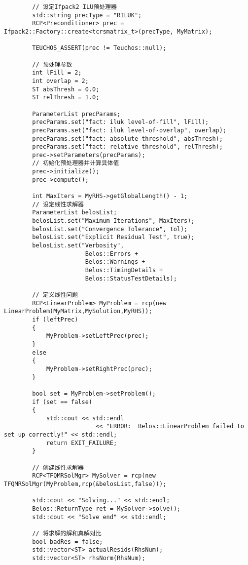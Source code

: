 \begin{lstlisting}
        // 设定Ifpack2 ILU预处理器
        std::string precType = "RILUK";
        RCP<Preconditioner> prec = Ifpack2::Factory::create<tcrsmatrix_t>(precType, MyMatrix);
        
        TEUCHOS_ASSERT(prec != Teuchos::null);

        // 预处理参数
        int lFill = 2;
        int overlap = 2;
        ST absThresh = 0.0;
        ST relThresh = 1.0;

        ParameterList precParams;
        precParams.set("fact: iluk level-of-fill", lFill);
        precParams.set("fact: iluk level-of-overlap", overlap);
        precParams.set("fact: absolute threshold", absThresh);
        precParams.set("fact: relative threshold", relThresh);
        prec->setParameters(precParams);
        // 初始化预处理器并计算具体值
        prec->initialize();
        prec->compute();

        int MaxIters = MyRHS->getGlobalLength() - 1;
        // 设定线性求解器
        ParameterList belosList;        
        belosList.set("Maximum Iterations", MaxIters);
        belosList.set("Convergence Tolerance", tol);    
        belosList.set("Explicit Residual Test", true); 
        belosList.set("Verbosity", 
                       Belos::Errors + 
                       Belos::Warnings + 
                       Belos::TimingDetails + 
                       Belos::StatusTestDetails);

        // 定义线性问题
        RCP<LinearProblem> MyProblem = rcp(new LinearProblem(MyMatrix,MySolution,MyRHS));
        if (leftPrec)
        {
            MyProblem->setLeftPrec(prec);            
        }
        else
        {
            MyProblem->setRightPrec(prec);  
        }

        bool set = MyProblem->setProblem();
        if (set == false)
        {
            std::cout << std::endl
                          << "ERROR:  Belos::LinearProblem failed to set up correctly!" << std::endl;
            return EXIT_FAILURE;
        }
        
        // 创建线性求解器
        RCP<TFQMRSolMgr> MySolver = rcp(new TFQMRSolMgr(MyProblem,rcp(&belosList,false)));
        
        std::cout << "Solving..." << std::endl;
        Belos::ReturnType ret = MySolver->solve();
        std::cout << "Solve end" << std::endl;

        // 将求解的解和真解对比
        bool badRes = false;
        std::vector<ST> actualResids(RhsNum);
        std::vector<ST> rhsNorm(RhsNum);


\end{lstlisting}
